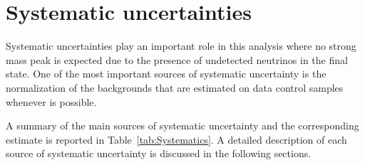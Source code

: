 \section{Systematic uncertainties}
\label{sec:Systematics}

Systematic uncertainties play an important role in this analysis where
no strong mass peak is expected due to the presence of undetected
neutrinos in the final state.  One of the most important sources of
systematic uncertainty is the normalization of the backgrounds that
are estimated on data control samples whenever is possible.

A summary of the main sources of systematic uncertainty and the corresponding estimate is reported in Table~\ref{tab:Systematics}. A detailed description of each source of systematic uncertainty is discussed in the following sections.

